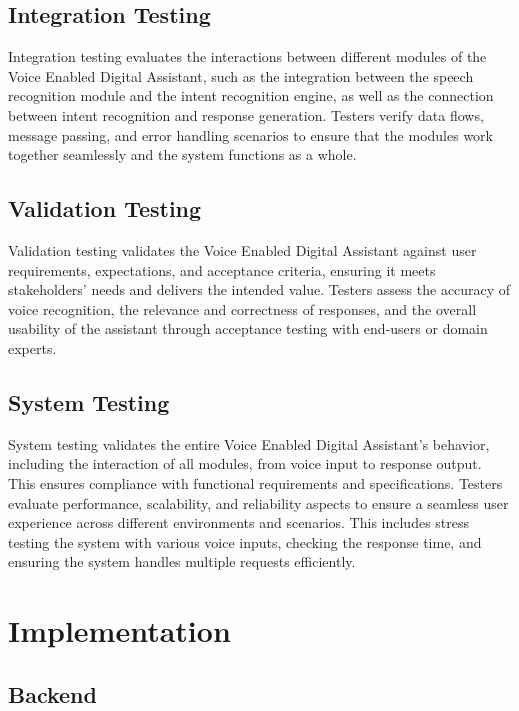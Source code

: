 \documentclass[12pt,a4paper]{report}
\begin{document}
\section{Integration Testing}
Integration testing evaluates the interactions between different modules of the Voice Enabled Digital Assistant, such as the integration between the speech recognition module and the intent recognition engine, as well as the connection between intent recognition and response generation. Testers verify data flows, message passing, and error handling scenarios to ensure that the modules work together seamlessly and the system functions as a whole.

\section{Validation Testing}
Validation testing validates the Voice Enabled Digital Assistant against user requirements, expectations, and acceptance criteria, ensuring it meets stakeholders' needs and delivers the intended value. Testers assess the accuracy of voice recognition, the relevance and correctness of responses, and the overall usability of the assistant through acceptance testing with end-users or domain experts.

\section{System Testing}
System testing validates the entire Voice Enabled Digital Assistant's behavior, including the interaction of all modules, from voice input to response output. This ensures compliance with functional requirements and specifications. Testers evaluate performance, scalability, and reliability aspects to ensure a seamless user experience across different environments and scenarios. This includes stress testing the system with various voice inputs, checking the response time, and ensuring the system handles multiple requests efficiently.






\newpage
\chapter{Implementation}
\section{Backend}
\end{document}
